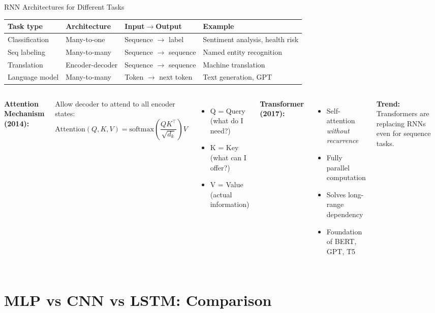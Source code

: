 \documentclass[aspectratio=169]{beamer}
\begin{document}
\begin{frame}{RNN Architectures for Different Tasks}

\begin{tabular}{@{}lll p{5.5cm}@{}}
\toprule
\textbf{Task type} & \textbf{Architecture} & \textbf{Input$\to$Output} & \textbf{Example} \\
\midrule
Classification & Many-to-one & Sequence $\to$ label & Sentiment analysis, health risk \\
Seq labeling & Many-to-many & Sequence $\to$ sequence & Named entity recognition \\
Translation & Encoder-decoder & Sequence $\to$ sequence & Machine translation \\
Language model & Many-to-many & Token $\to$ next token & Text generation, GPT \\
\bottomrule
\end{tabular}

\vspace{0.4cm}
\begin{columns}
\textbf{Attention Mechanism (2014):}

Allow decoder to attend to all encoder states:
\[
\text{Attention}(Q, K, V) = \text{softmax}\!\left(\frac{QK^\top}{\sqrt{d_k}}\right) V
\]
\begin{itemize}
    \item Q = Query (what do I need?)
    \item K = Key (what can I offer?)
    \item V = Value (actual information)
\end{itemize}

\textbf{Transformer (2017):}
\begin{itemize}
    \item Self-attention \emph{without recurrence}
    \item Fully parallel computation
    \item Solves long-range dependency
    \item Foundation of BERT, GPT, T5
\end{itemize}

\vspace{0.2cm}
\textbf{Trend:} Transformers are replacing RNNs even for sequence tasks.
\end{columns}
\end{frame}

\section{MLP vs CNN vs LSTM: Comparison}
\end{document}
